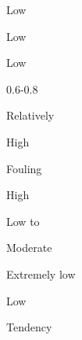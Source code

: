 \documentclass[a4paper,portrait,12pt]{article}
\begin{document}
\begin{flushleft}
Low
\end{flushleft}





\begin{flushleft}
Low
\end{flushleft}





\begin{flushleft}
Low
\end{flushleft}





0.6-0.8


\begin{flushleft}
Relatively
\end{flushleft}


\begin{flushleft}
High
\end{flushleft}





\begin{flushleft}
Fouling
\end{flushleft}





\begin{flushleft}
High
\end{flushleft}





\begin{flushleft}
Low to
\end{flushleft}


\begin{flushleft}
Moderate
\end{flushleft}





\begin{flushleft}
Extremely low
\end{flushleft}





\begin{flushleft}
Low
\end{flushleft}





\begin{flushleft}
Tendency
\end{flushleft}
\end{document}
